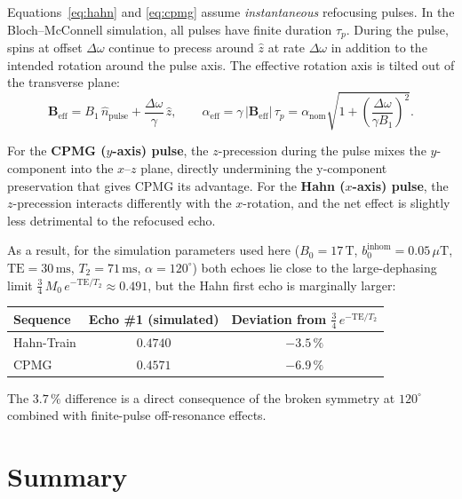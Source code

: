 \documentclass[11pt, a4paper]{article}
\begin{document}
Equations~\eqref{eq:hahn} and \eqref{eq:cpmg} assume \emph{instantaneous} refocusing
pulses.  In the Bloch--McConnell simulation, all pulses have finite duration $\tau_p$.
During the pulse, spins at offset $\Delta\omega$ continue to precess around $\hat{z}$ at
rate $\Delta\omega$ in addition to the intended rotation around the pulse axis.  The
effective rotation axis is tilted out of the transverse plane:
\begin{equation}
  \mathbf{B}_{\mathrm{eff}} = B_1\,\hat{n}_{\mathrm{pulse}} + \frac{\Delta\omega}{\gamma}\,\hat{z},
  \qquad
  \alpha_{\mathrm{eff}} = \gamma\,|\mathbf{B}_{\mathrm{eff}}|\,\tau_p
               = \alpha_{\mathrm{nom}}\sqrt{1 + \left(\frac{\Delta\omega}{\gamma B_1}\right)^2}.
\end{equation}

For the \textbf{CPMG ($y$-axis) pulse}, the $z$-precession during the pulse mixes the
$y$-component into the $x$--$z$ plane, directly undermining the y-component preservation
that gives CPMG its advantage.  For the \textbf{Hahn ($x$-axis) pulse}, the $z$-precession
interacts differently with the $x$-rotation, and the net effect is slightly less
detrimental to the refocused echo.

As a result, for the simulation parameters used here
($B_0 = 17\,\mathrm{T}$, $b_0^\mathrm{inhom} = 0.05\,\mu\mathrm{T}$,
$\mathrm{TE} = 30\,\mathrm{ms}$, $T_2 = 71\,\mathrm{ms}$, $\alpha = 120^\circ$) both
echoes lie close to the large-dephasing limit
$\tfrac{3}{4}\,M_0\,e^{-\mathrm{TE}/T_2} \approx 0.491$, but the Hahn first echo is
marginally larger:

\begin{center}
\begin{tabular}{lcc}
  \toprule
  Sequence & Echo \#1 (simulated) & Deviation from $\tfrac{3}{4}\,e^{-\mathrm{TE}/T_2}$ \\
  \midrule
  Hahn-Train & $0.4740$ & $-3.5\,\%$ \\
  CPMG       & $0.4571$ & $-6.9\,\%$ \\
  \bottomrule
\end{tabular}
\end{center}

The $3.7\,\%$ difference is a direct consequence of the broken symmetry at $120^\circ$
combined with finite-pulse off-resonance effects.

\section{Summary}
\end{document}

